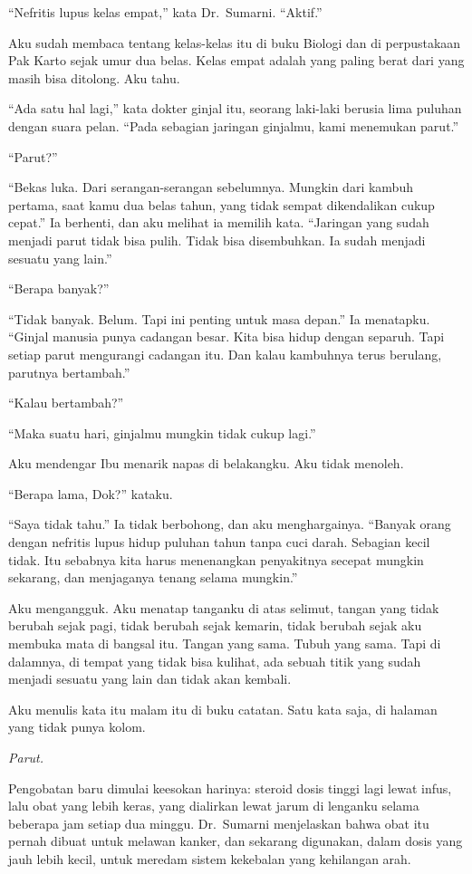 \documentclass[11pt,twoside,openany]{book}
\makeatletter
\newcommand{\scenebreak}{\par\vspace{0.9em}{\centering\textsc{*\hspace{0.7em}*\hspace{0.7em}*}\par}\vspace{0.9em}\@afterindentfalse\@afterheading}
\makeatother
\begin{document}
``Nefritis lupus kelas empat,'' kata Dr.~Sumarni. ``Aktif.''

Aku sudah membaca tentang kelas-kelas itu di buku Biologi dan di perpustakaan Pak Karto sejak umur dua belas. Kelas empat adalah yang paling berat dari yang masih bisa ditolong. Aku tahu.

``Ada satu hal lagi,'' kata dokter ginjal itu, seorang laki-laki berusia lima puluhan dengan suara pelan. ``Pada sebagian jaringan ginjalmu, kami menemukan parut.''

``Parut?''

``Bekas luka. Dari serangan-serangan sebelumnya. Mungkin dari kambuh pertama, saat kamu dua belas tahun, yang tidak sempat dikendalikan cukup cepat.'' Ia berhenti, dan aku melihat ia memilih kata. ``Jaringan yang sudah menjadi parut tidak bisa pulih. Tidak bisa disembuhkan. Ia sudah menjadi sesuatu yang lain.''

``Berapa banyak?''

``Tidak banyak. Belum. Tapi ini penting untuk masa depan.'' Ia menatapku. ``Ginjal manusia punya cadangan besar. Kita bisa hidup dengan separuh. Tapi setiap parut mengurangi cadangan itu. Dan kalau kambuhnya terus berulang, parutnya bertambah.''

``Kalau bertambah?''

``Maka suatu hari, ginjalmu mungkin tidak cukup lagi.''

Aku mendengar Ibu menarik napas di belakangku. Aku tidak menoleh.

``Berapa lama, Dok?'' kataku.

``Saya tidak tahu.'' Ia tidak berbohong, dan aku menghargainya. ``Banyak orang dengan nefritis lupus hidup puluhan tahun tanpa cuci darah. Sebagian kecil tidak. Itu sebabnya kita harus menenangkan penyakitnya secepat mungkin sekarang, dan menjaganya tenang selama mungkin.''

Aku mengangguk. Aku menatap tanganku di atas selimut, tangan yang tidak berubah sejak pagi, tidak berubah sejak kemarin, tidak berubah sejak aku membuka mata di bangsal itu. Tangan yang sama. Tubuh yang sama. Tapi di dalamnya, di tempat yang tidak bisa kulihat, ada sebuah titik yang sudah menjadi sesuatu yang lain dan tidak akan kembali.

Aku menulis kata itu malam itu di buku catatan. Satu kata saja, di halaman yang tidak punya kolom.

\emph{Parut.}

\scenebreak
Pengobatan baru dimulai keesokan harinya: steroid dosis tinggi lagi lewat infus, lalu obat yang lebih keras, yang dialirkan lewat jarum di lenganku selama beberapa jam setiap dua minggu. Dr.~Sumarni menjelaskan bahwa obat itu pernah dibuat untuk melawan kanker, dan sekarang digunakan, dalam dosis yang jauh lebih kecil, untuk meredam sistem kekebalan yang kehilangan arah.
\end{document}
